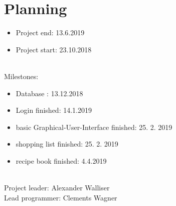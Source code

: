 \documentclass[12pt]{article}
\theoremstyle{definition}
\begin{document}
\pagebreak

\section{Planning}

\begin{itemize}
\item Project end: 13.6.2019
\item Project start: 23.10.2018 \\\\
\end{itemize}

Milestones:
\begin{itemize}
\item Database : 13.12.2018
\item Login finished: 14.1.2019
\item basic Graphical-User-Interface finished: 25. 2. 2019
\item shopping list finished: 25. 2. 2019
\item recipe book finished: 4.4.2019 \\\\
\end{itemize}


Project leader: Alexander Walliser \\
Lead programmer: Clements Wagner
\end{document}
